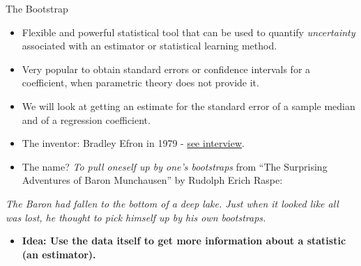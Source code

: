 \documentclass[10pt,ignorenonframetext,]{beamer}
\providecommand{\tightlist}{%
  \setlength{\itemsep}{0pt}\setlength{\parskip}{0pt}}
\begin{document}
\begin{frame}{The Bootstrap}

\vspace{2mm}

\begin{itemize}
\tightlist
\item
  Flexible and powerful statistical tool that can be used to quantify
  \emph{uncertainty} associated with an estimator or statistical
  learning method.
\end{itemize}

\vspace{2mm}

\begin{itemize}
\tightlist
\item
  Very popular to obtain standard errors or confidence intervals for a
  coefficient, when parametric theory does not provide it.
\end{itemize}

\vspace{2mm}

\begin{itemize}
\tightlist
\item
  We will look at getting an estimate for the standard error of a sample
  median and of a regression coefficient.
\end{itemize}

\end{frame}

\begin{frame}

\begin{itemize}
\item
  The inventor: Bradley Efron in 1979 -
  \href{https://www.youtube.com/watch?v=6l9V1sINzhE}{see interview}.
\item
  The name? \emph{To pull oneself up by one's bootstraps} from ``The
  Surprising Adventures of Baron Munchausen'' by Rudolph Erich Raspe:
\end{itemize}

\emph{The Baron had fallen to the bottom of a deep lake. Just when it
looked like all was lost, he thought to pick himself up by his own
bootstraps.}

\begin{itemize}
\tightlist
\item
  \textbf{Idea: Use the data itself to get more information about a
  statistic (an estimator).}
\end{itemize}

\end{frame}
\end{document}
